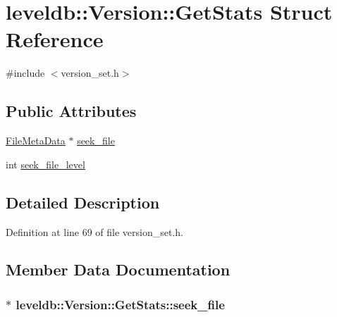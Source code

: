 \hypertarget{structleveldb_1_1_version_1_1_get_stats}{}\section{leveldb\+:\+:Version\+:\+:Get\+Stats Struct Reference}
\label{structleveldb_1_1_version_1_1_get_stats}


{\ttfamily \#include $<$version\+\_\+set.\+h$>$}

\subsection*{Public Attributes}
\begin{DoxyCompactItemize}
\item 
\hyperlink{structleveldb_1_1_file_meta_data}{File\+Meta\+Data} $\ast$ \hyperlink{structleveldb_1_1_version_1_1_get_stats_a8c677e9a2d5bc48a5bcc40e07dd2cca7}{seek\+\_\+file}
\item 
int \hyperlink{structleveldb_1_1_version_1_1_get_stats_a6cd952d5850faf00c7d45f79973a76d4}{seek\+\_\+file\+\_\+level}
\end{DoxyCompactItemize}


\subsection{Detailed Description}


Definition at line 69 of file version\+\_\+set.\+h.



\subsection{Member Data Documentation}
\hypertarget{structleveldb_1_1_version_1_1_get_stats_a8c677e9a2d5bc48a5bcc40e07dd2cca7}{}
\subsubsection[{seek\+\_\+file}]{$\ast$ leveldb\+::\+Version\+::\+Get\+Stats\+::seek\+\_\+file}\label{structleveldb_1_1_version_1_1_get_stats_a8c677e9a2d5bc48a5bcc40e07dd2cca7}


